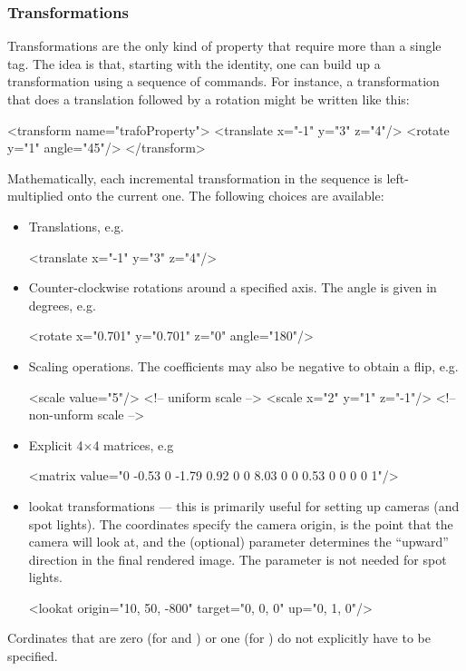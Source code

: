 \subsubsection{Transformations}
Transformations are the only kind of property that require more than a single tag. The idea is that, starting
with the identity, one can build up a transformation using a sequence of commands. For instance, a transformation that 
does a translation followed by a rotation might be written like this:
\begin{xml}
<transform name="trafoProperty">
	<translate x="-1" y="3" z="4"/>
	<rotate y="1" angle="45"/>
</transform>
\end{xml}
Mathematically, each incremental transformation in the sequence is left-multiplied onto the current one. The following
choices are available:
\begin{itemize}
\item Translations, e.g.
\begin{xml}
<translate x="-1" y="3" z="4"/>
\end{xml}
\item Counter-clockwise rotations around a specified axis. The angle is given in degrees, e.g.
\begin{xml}
<rotate x="0.701" y="0.701" z="0" angle="180"/>
\end{xml}
\item Scaling operations. The coefficients may also be negative to obtain a flip, e.g.
\begin{xml}
<scale value="5"/>           <!-- uniform scale -->
<scale x="2" y="1" z="-1"/>  <!-- non-unform scale -->
\end{xml}
\item Explicit 4$\times$4 matrices, e.g
\begin{xml}
<matrix value="0 -0.53 0 -1.79 0.92 0 0 8.03 0 0 0.53 0 0 0 0 1"/>
\end{xml}
\item lookat transformations --- this is primarily useful for setting up cameras (and spot lights). The  coordinates
specify the camera origin,  is the point that the camera will look at, and the 
(optional)  parameter determines the ``upward'' direction in the final rendered image.
The  parameter is not needed for spot lights.
\begin{xml}
<lookat origin="10, 50, -800" target="0, 0, 0" up="0, 1, 0"/>
\end{xml}
\end{itemize}
Cordinates that are zero (for  and ) or one (for )
do not explicitly have to be specified.
